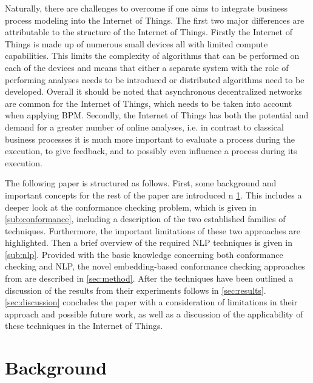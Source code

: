 \documentclass[runningheads]{template/llncs}
\begin{document}
Naturally, there are challenges to overcome if one aims to integrate business process modeling into the Internet of Things.
The first two major differences are attributable to the structure of the Internet of Things.
Firstly the Internet of Things is made up of numerous small devices all with limited compute capabilities.
This limits the complexity of algorithms that can be performed on each of the devices and means that either a separate system with the role of performing analyses needs to be introduced or distributed algorithms need to be developed.
Overall it should be noted that asynchronous decentralized networks are common for the Internet of Things, which needs to be taken into account when applying BPM.
Secondly, the Internet of Things has both the potential and demand for a greater number of online analyses, i.e. in contrast to classical business processes it is much more important to evaluate a process during the execution, to give feedback, and to possibly even influence a process during its execution.


The following paper is structured as follows.
First, some background and important concepts for the rest of the paper are introduced n \cref{sec:background}.
This includes a deeper look at the conformance checking problem, which is given in \cref{sub:conformance}, including a description of the two established families of techniques.
Furthermore, the important limitations of these two approaches are highlighted.
Then a brief overview of the required NLP techniques is given in \cref{sub:nlp}.
Provided with the basic knowledge concerning both conformance checking and NLP, the novel embedding-based conformance checking approaches from \cite{PBWe20} are described in \cref{sec:method}.
After the techniques have been outlined a discussion of the results from their experiments follows in \cref{sec:results}.
\cref{sec:discussion} concludes the paper with a consideration of limitations in their approach and possible future work, as well as a discussion of the applicability of these techniques in the Internet of Things.


\section{Background}
\label{sec:background}
\end{document}
